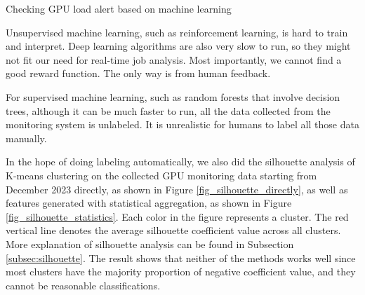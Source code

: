 \begin{algorithm}[H]
\SetAlgoLined
{}



\caption{Checking GPU load alert based on machine learning}
\label{algo:ml}
\end{algorithm}

Unsupervised machine learning, such as reinforcement learning, is hard to train and interpret. Deep learning algorithms are also very slow to run, so they might not fit our need for real-time job analysis. Most importantly, we cannot find a good reward function. The only way is from human feedback.

For supervised machine learning, such as random forests that involve decision trees, although it can be much faster to run, all the data collected from the monitoring system is unlabeled. It is unrealistic for humans to label all those data manually.

In the hope of doing labeling automatically, we also did the silhouette analysis of K-means clustering on the collected GPU monitoring data starting from December 2023 directly, as shown in Figure \ref{fig_silhouette_directly}, as well as features generated with statistical aggregation, as shown in Figure \ref{fig_silhouette_statistics}. Each color in the figure represents a cluster. The red vertical line denotes the average silhouette coefficient value across all clusters. More explanation of silhouette analysis can be found in Subsection \ref{subsec:silhouette}. The result shows that neither of the methods works well since most clusters have the majority proportion of negative coefficient value, and they cannot be reasonable classifications. 

